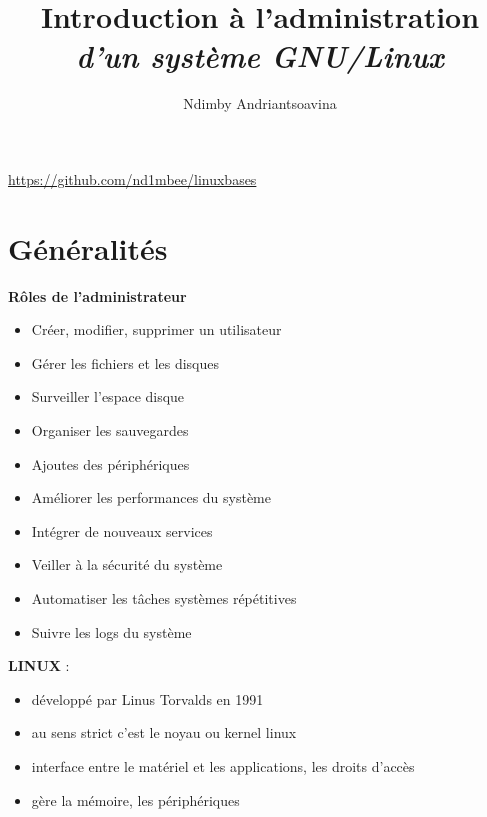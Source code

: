 \documentclass[french]{beamer}
\title{Introduction à l'administration \\ \textit{d'un système GNU/Linux}}
\author{Ndimby Andriantsoavina}
\institute{Agence universitaire de la Francophonie}
\begin{document}
\begin{frame}
\titlepage
\begin{center}
\url{https://github.com/nd1mbee/linuxbases}
\end{center}
\end{frame}

\section{Généralités}
\frame{\tableofcontents[current]}



\begin{frame}
\begin{center}
\textbf{Rôles de l'administrateur}
\end{center}
\begin{itemize}
\item Créer, modifier, supprimer un utilisateur
\item Gérer les fichiers et les disques
\item Surveiller l'espace disque
\item Organiser les sauvegardes
\item Ajoutes des périphériques
\item Améliorer les performances du système
\item Intégrer de nouveaux services
\item Veiller à la sécurité du système
\item Automatiser les tâches systèmes répétitives
\item Suivre les logs du système
\end{itemize}
\end{frame}

\begin{frame}
\textbf{LINUX} :
    \begin{itemize}
    \item développé par Linus Torvalds en 1991
    \item au sens strict c'est le noyau ou kernel linux
    \item interface entre le matériel et les applications, les droits d'accès
    \item gère la mémoire, les périphériques 
    \end{itemize}
\end{frame}
\end{document}
